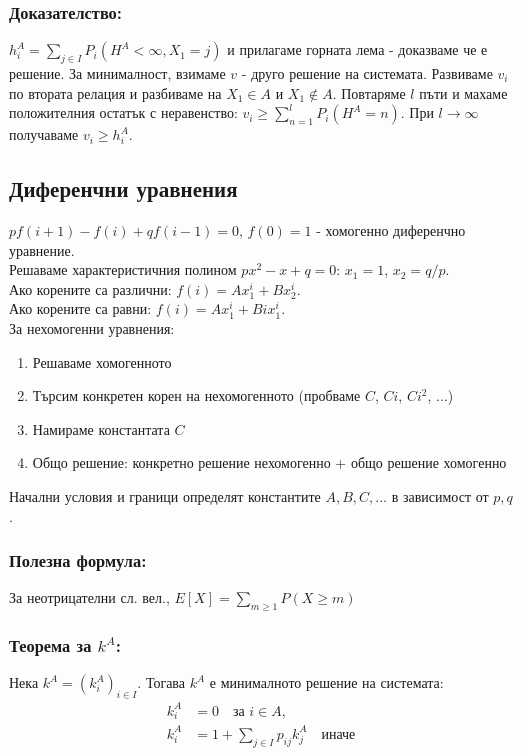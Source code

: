 \documentclass{article}
\begin{document}
\subsubsection*{Доказателство:}
$h_i^A = \sum_{j \in I} P_i(H^A < \infty, X_1 = j)$ и прилагаме горната лема - доказваме че е решение. 
За минималност, взимаме $v$ - друго решение на системата. 
Развиваме $v_i$ по втората релация и разбиваме на $X_1 \in A$ и $X_1 \notin A$. 
Повтаряме $l$ пъти и махаме положителния остатък с неравенство: $v_i \geq \sum_{n=1}^l P_i(H^A = n)$. 
При $l \to \infty$ получаваме $v_i \geq h_i^A$.

\subsection{Диференчни уравнения}
$pf(i+1) - f(i) + qf(i-1) = 0$, $f(0) = 1$ - хомогенно диференчно уравнение. \\
Решаваме характеристичния полином $px^2 - x + q = 0$: $x_1 = 1$, $x_2 = q/p$. \\
Ако корените са различни: $f(i) = A x_1^i + B x_2^i$. \\
Ако корените са равни: $f(i) = A x_1^i + B i x_1^i$. \\

За нехомогенни уравнения:
\begin{enumerate}
\item Решаваме хомогенното
\item Търсим конкретен корен на нехомогенното (пробваме $C$, $Ci$, $Ci^2$, ...)
\item Намираме константата $C$
\item Общо решение: конкретно решение нехомогенно + общо решение хомогенно
\end{enumerate}

Начални условия и граници определят константите $A,B,C,...$ в зависимост от $p,q$.

\subsubsection*{Полезна формула:}
За неотрицателни сл. вел., $E[X] = \sum_{m \geq 1} P(X \geq m)$

\subsubsection*{Теорема за $k^A$:}
Нека $k^A = (k_i^A)_{i \in I}$. Тогава $k^A$ е минималното решение на системата:
\begin{align*}
k_i^A &= 0 \quad \text{за } i \in A, \\
k_i^A &= 1 + \sum_{j \in I} p_{ij} k_j^A \quad \text{иначе}
\end{align*}
\end{document}
